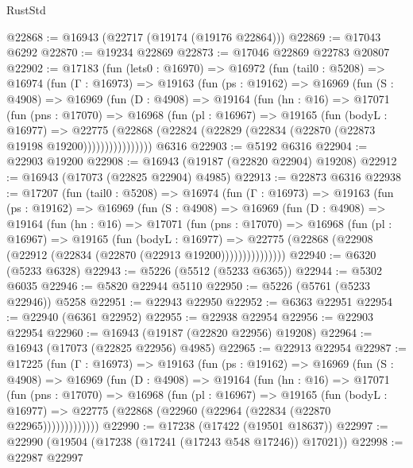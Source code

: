 \begin{lexlean}{RustStd}
\begin{coremodule}
@22868 := @16943 (@22717 (@19174 (@19176 @22864)))
@22869 := @17043 @6292
@22870 := @19234 @22869
@22873 := @17046 @22869 @22783 @20807
@22902 := @17183
    (fun (lets0 : @16970) =>
    @16972
      (fun (tail0 : @5208) =>
      @16974
        (fun (Γ : @16973) =>
        @19163
          (fun (ps : @19162) =>
          @16969
            (fun (S : @4908) =>
            @16969
              (fun (D : @4908) =>
              @19164
                (fun (hn : @16) =>
                @17071
                  (fun (pns : @17070) =>
                  @16968
                    (fun (pl : @16967) =>
                    @19165
                      (fun (bodyL : @16977) =>
                      @22775
                        (@22868
                          (@22824 (@22829 (@22834 (@22870 (@22873 @19198 @19200))))))))))))))))
    @6316
@22903 := @5192 @6316
@22904 := @22903 @19200
@22908 := @16943 (@19187 (@22820 @22904) @19208)
@22912 := @16943 (@17073 (@22825 @22904) @4985)
@22913 := @22873 @6316
@22938 := @17207
    (fun (tail0 : @5208) =>
    @16974
      (fun (Γ : @16973) =>
      @19163
        (fun (ps : @19162) =>
        @16969
          (fun (S : @4908) =>
          @16969
            (fun (D : @4908) =>
            @19164
              (fun (hn : @16) =>
              @17071
                (fun (pns : @17070) =>
                @16968
                  (fun (pl : @16967) =>
                  @19165
                    (fun (bodyL : @16977) =>
                    @22775 (@22868 (@22908 (@22912 (@22834 (@22870 (@22913 @19200)))))))))))))))
@22940 := @6320 (@5233 @6328)
@22943 := @5226 (@5512 (@5233 @6365))
@22944 := @5302 @6035
@22946 := @5820 @22944 @5110
@22950 := @5226 (@5761 (@5233 @22946)) @5258
@22951 := @22943 @22950
@22952 := @6363 @22951
@22954 := @22940 (@6361 @22952)
@22955 := @22938 @22954
@22956 := @22903 @22954
@22960 := @16943 (@19187 (@22820 @22956) @19208)
@22964 := @16943 (@17073 (@22825 @22956) @4985)
@22965 := @22913 @22954
@22987 := @17225
    (fun (Γ : @16973) =>
    @19163
      (fun (ps : @19162) =>
      @16969
        (fun (S : @4908) =>
        @16969
          (fun (D : @4908) =>
          @19164
            (fun (hn : @16) =>
            @17071
              (fun (pns : @17070) =>
              @16968
                (fun (pl : @16967) =>
                @19165
                  (fun (bodyL : @16977) =>
                  @22775 (@22868 (@22960 (@22964 (@22834 (@22870 @22965)))))))))))))
@22990 := @17238 (@17422 (@19501 @18637))
@22997 := @22990 (@19504 (@17238 (@17241 (@17243 @548 @17246)) @17021))
@22998 := @22987 @22997

\end{coremodule}
\end{lexlean}
